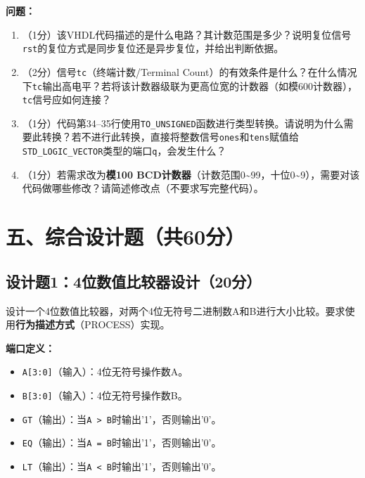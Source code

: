 \begin{framed}
\textbf{问题：}
\begin{enumerate}[label=(\arabic*)]
  \item （1分）该VHDL代码描述的是什么电路？其计数范围是多少？说明复位信号\texttt{rst}的复位方式是同步复位还是异步复位，并给出判断依据。
  \item （2分）信号\texttt{tc}（终端计数/Terminal Count）的有效条件是什么？在什么情况下\texttt{tc}输出高电平？若将该计数器级联为更高位宽的计数器（如模600计数器），\texttt{tc}信号应如何连接？
  \item （1分）代码第34--35行使用\texttt{TO\_UNSIGNED}函数进行类型转换。请说明为什么需要此转换？若不进行此转换，直接将整数信号\texttt{ones}和\texttt{tens}赋值给\texttt{STD\_LOGIC\_VECTOR}类型的端口\texttt{q}，会发生什么？
  \item （1分）若需求改为\textbf{模100 BCD计数器}（计数范围0\~{}99，十位0\~{}9），需要对该代码做哪些修改？请简述修改点（不要求写完整代码）。
\end{enumerate}
\end{framed}

\newpage

\section*{五、综合设计题（共60分）}

\subsection*{设计题1：4位数值比较器设计（20分）}

设计一个4位数值比较器，对两个4位无符号二进制数A和B进行大小比较。要求使用\textbf{行为描述方式}（PROCESS）实现。

\vspace{0.3cm}

\textbf{端口定义：}
\begin{itemize}
  \item \texttt{A[3:0]}（输入）：4位无符号操作数A。
  \item \texttt{B[3:0]}（输入）：4位无符号操作数B。
  \item \texttt{GT}（输出）：当\texttt{A > B}时输出'1'，否则输出'0'。
  \item \texttt{EQ}（输出）：当\texttt{A = B}时输出'1'，否则输出'0'。
  \item \texttt{LT}（输出）：当\texttt{A < B}时输出'1'，否则输出'0'。
\end{itemize}

